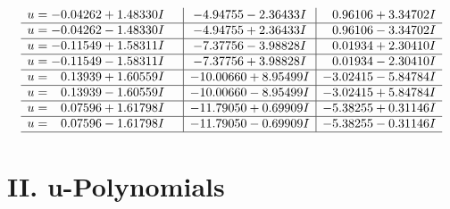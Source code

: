 \documentclass[1p]{elsarticle_modified}
\theoremstyle{definition}
\begin{document}
$$\begin{array}{c|c|c}
\begin{aligned}
u &= -0.04262 + 1.48330 I\end{aligned}
 & -4.94755 - 2.36433 I & \phantom{-}0.96106 + 3.34702 I \\ \hline\begin{aligned}
u &= -0.04262 - 1.48330 I\end{aligned}
 & -4.94755 + 2.36433 I & \phantom{-}0.96106 - 3.34702 I \\ \hline\begin{aligned}
u &= -0.11549 + 1.58311 I\end{aligned}
 & -7.37756 - 3.98828 I & \phantom{-}0.01934 + 2.30410 I \\ \hline\begin{aligned}
u &= -0.11549 - 1.58311 I\end{aligned}
 & -7.37756 + 3.98828 I & \phantom{-}0.01934 - 2.30410 I \\ \hline\begin{aligned}
u &= \phantom{-}0.13939 + 1.60559 I\end{aligned}
 & -10.00660 + 8.95499 I & -3.02415 - 5.84784 I \\ \hline\begin{aligned}
u &= \phantom{-}0.13939 - 1.60559 I\end{aligned}
 & -10.00660 - 8.95499 I & -3.02415 + 5.84784 I \\ \hline\begin{aligned}
u &= \phantom{-}0.07596 + 1.61798 I\end{aligned}
 & -11.79050 + 0.69909 I & -5.38255 + 0.31146 I \\ \hline\begin{aligned}
u &= \phantom{-}0.07596 - 1.61798 I\end{aligned}
 & -11.79050 - 0.69909 I & -5.38255 - 0.31146 I\\
 \hline 
 \end{array}$$\newpage
\newpage\renewcommand{\arraystretch}{1}
\centering \section*{ II. u-Polynomials}
\end{document}
